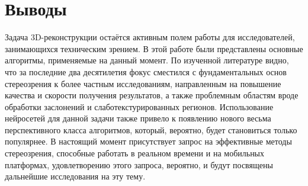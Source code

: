 \section{Выводы}
\label{conclusion}

Задача 3D-реконструкции остаётся активным полем работы для исследователей, занимающихся техническим зрением. В этой работе были представлены основные алгоритмы, применяемые на данный момент. По изученной литературе видно, что за последние два десятилетия  
фокус сместился с фундаментальных основ стереозрения к более частным исследованиям, направленным на повышение качества и скорости получения результатов, а также проблемным областям вроде обработки заслонений и слаботекстурированных регионов. Использование нейросетей 
для данной задачи также привело к появлению нового весьма перспективного класса алгоритмов, который, вероятно, будет становиться только популярнее. В настоящий момент присутствует запрос на эффективные методы стереозрения, способные работать в реальном времени и на 
мобильных платформах, удовлетворению этого запроса, вероятно, и будут посвящены дальнейшие исследования на эту тему. 



\newpage




